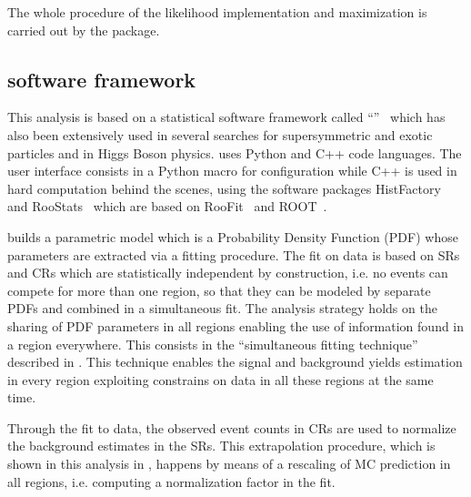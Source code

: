 The whole procedure of the likelihood implementation and maximization is carried out by the \hf package.

\subsection{\hf software framework}
\label{sec:hf}
This analysis is based on a statistical software framework called ``\hf''~\cite{baak:histfitter} which has also been extensively used in several searches for supersymmetric and exotic particles and in Higgs Boson physics. 
\hf uses Python and C++ code languages. The user interface consists in a Python macro for configuration while C++ is used in hard computation behind the scenes, using the software packages HistFactory~\cite{Cranmer:1456844} and RooStats~\cite{2010acat.confE..57M} which are based on RooFit~\cite{2003physics...6116V} and ROOT~\cite{Brun:1997pa}.

\hf builds a parametric model which is a Probability Density Function (PDF) whose parameters are extracted via a fitting procedure. The fit on data is based on SRs and CRs which are statistically independent by construction, i.e. no events can compete for more than one region, so that they can be modeled by separate PDFs and combined in a simultaneous fit. The \hf analysis strategy holds on the sharing of PDF parameters in all regions enabling the use of information found in a region everywhere. This consists in the ``simultaneous fitting technique'' described in \Sect{\ref{sec:simfit}}. This technique enables the signal and background yields estimation in every region exploiting constrains on data in all these regions at the same time.

Through the fit to data, the observed event counts in CRs are used to normalize the background estimates in the SRs. This extrapolation procedure, which is shown in this analysis in \Fig{\ref{fig:regions}}, happens by means of a rescaling of MC prediction in all regions, i.e. computing a normalization factor in the fit.


